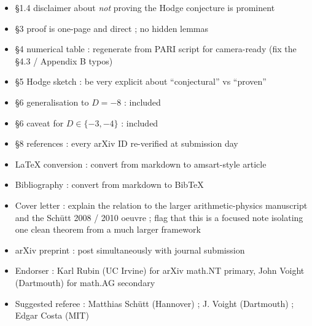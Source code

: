 \documentclass[
  11pt,
  a4paper,
]{amsart}
\providecommand{\tightlist}{\setlength{\itemsep}{0pt}\setlength{\parskip}{0pt}}
\providecommand{\tightlist}{%
  \setlength{\itemsep}{0pt}\setlength{\parskip}{0pt}}
\begin{document}
\begin{itemize}
\tightlist
\item[$\square$]
  §1.4 disclaimer about \emph{not} proving the Hodge conjecture is prominent
\item[$\square$]
  §3 proof is one-page and direct ; no hidden lemmas
\item[$\square$]
  §4 numerical table : regenerate from PARI script for camera-ready (fix the §4.3 / Appendix B typos)
\item[$\square$]
  §5 Hodge sketch : be very explicit about ``conjectural'' vs ``proven''
\item[$\square$]
  §6 generalisation to \(D = -8\) : included
\item[$\square$]
  §6 caveat for \(D \in \{-3, -4\}\) : included
\item[$\square$]
  §8 references : every arXiv ID re-verified at submission day
\item[$\square$]
  LaTeX conversion : convert from markdown to amsart-style article
\item[$\square$]
  Bibliography : convert from markdown to BibTeX
\item[$\square$]
  Cover letter : explain the relation to the larger arithmetic-physics manuscript and the Schütt 2008 / 2010 oeuvre ; flag that this is a focused note isolating one clean theorem from a much larger framework
\item[$\square$]
  arXiv preprint : post simultaneously with journal submission
\item[$\square$]
  Endorser : Karl Rubin (UC Irvine) for arXiv math.NT primary, John Voight (Dartmouth) for math.AG secondary
\item[$\square$]
  Suggested referee : Matthias Schütt (Hannover) ; J. Voight (Dartmouth) ; Edgar Costa (MIT)
\end{itemize}
\end{document}
